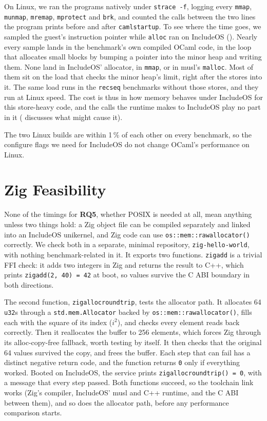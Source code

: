 \documentclass[12pt]{report}
\newcommand{\fullref}[1]{\Cref{#1}}
\renewcommand{\_}{\origunderscore\allowbreak}
\begin{document}
On Linux, we ran the programs natively under \texttt{strace -f}, logging every \texttt{mmap}, \texttt{munmap}, \texttt{mremap}, \texttt{mprotect} and \texttt{brk}, and counted the calls between the two lines the program prints before and after \texttt{caml\_startup}.
To see where the time goes, we sampled the guest's instruction pointer while \texttt{alloc} ran on IncludeOS (\fullref{sec:eval-methodology}). Nearly every sample lands in the benchmark's own compiled OCaml code, in the loop that allocates small blocks by bumping a pointer into the minor heap and writing them. None land in IncludeOS' allocator, in \texttt{mmap}, or in musl's \texttt{malloc}. Most of them sit on the load that checks the minor heap's limit, right after the stores into it. The same load runs in the \texttt{rec\_seq\_*} benchmarks without those stores, and they run at Linux speed. The cost is thus in how memory behaves under IncludeOS for this store-heavy code, and the calls the runtime makes to IncludeOS play no part in it (\fullref{sec:discussion-results} discusses what might cause it).

The two Linux builds are within 1\,\% of each other on every benchmark, so the configure flags we need for IncludeOS do not change OCaml's performance on Linux.

\section{Zig Feasibility}
\label{sec:eval-zig-feasibility}

None of the timings for \textbf{RQ5}, whether POSIX is needed at all, mean anything unless two things hold: a Zig object file can be compiled separately and linked into an IncludeOS unikernel, and Zig code can use \texttt{os::mem::raw\_allocator()} correctly. We check both in a separate, minimal repository, \texttt{zig-hello-world}, with nothing benchmark-related in it. It exports two functions. \texttt{zig\_add} is a trivial FFI check: it adds two integers in Zig and returns the result to C++, which prints \texttt{zig\_add(2, 40) = 42} at boot, so values survive the C ABI boundary in both directions.

The second function, \texttt{zig\_alloc\_roundtrip}, tests the allocator path. It allocates 64 \texttt{u32}s through a \texttt{std.mem.Allocator} backed by \texttt{os::mem::raw\_allocator()}, fills each with the square of its index ($i^2$), and checks every element reads back correctly. Then it reallocates the buffer to 256 elements, which forces Zig through its alloc-copy-free fallback, worth testing by itself. It then checks that the original 64 values survived the copy, and frees the buffer. Each step that can fail has a distinct negative return code, and the function returns \texttt{0} only if everything worked. Booted on IncludeOS, the service prints \texttt{zig\_alloc\_roundtrip() = 0}, with a message that every step passed. Both functions succeed, so the toolchain link works (Zig's compiler, IncludeOS' musl and C++ runtime, and the C ABI between them), and so does the allocator path, before any performance comparison starts.
\end{document}
